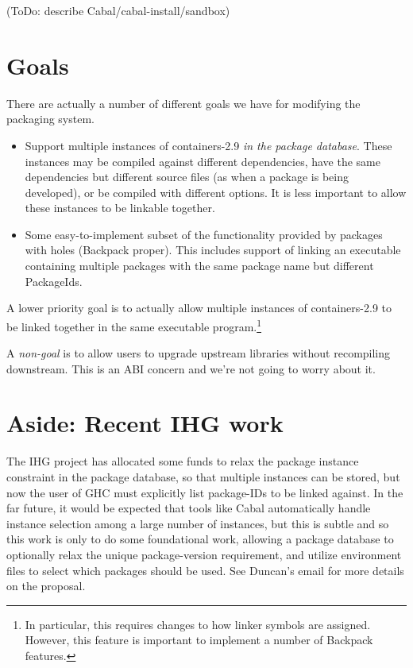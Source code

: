 \documentclass{article}
\begin{document}
(ToDo: describe Cabal/cabal-install/sandbox)

\section{Goals}

There are actually a number of different goals we have for modifying the
packaging system.

\begin{itemize}
    \item Support multiple instances of containers-2.9 \emph{in the
        package database}.  These instances may be compiled against
        different dependencies, have the same dependencies but different
        source files (as when a package is being developed), or be
        compiled with different options.  It is less important to allow
        these instances to be linkable together.

    \item Some easy-to-implement subset of the functionality provided by
        packages with holes (Backpack proper).  This includes support
        of linking an executable containing multiple packages with the
        same package name but different PackageIds.
\end{itemize}

A lower priority goal is to actually allow multiple instances of
containers-2.9 to be linked together in the same executable
program.\footnote{In particular, this requires changes to how linker symbols
are assigned. However, this feature is important to implement a number
of Backpack features.}

A \emph{non-goal} is to allow users to upgrade upstream libraries
without recompiling downstream. This is an ABI concern and we're not
going to worry about it.

\section{Aside: Recent IHG work}\label{sec:ihg}

The IHG project has allocated some funds to relax the package instance
constraint in the package database, so that multiple instances can be
stored, but now the user of GHC must explicitly list package-IDs to be
linked against.  In the far future, it would be expected that tools like
Cabal automatically handle instance selection among a large number of
instances, but this is subtle and so this work is only to do some
foundational work, allowing a package database to optionally relax the
unique package-version requirement, and utilize environment files to
select which packages should be used.  See Duncan's email for more
details on the proposal.
\end{document}
